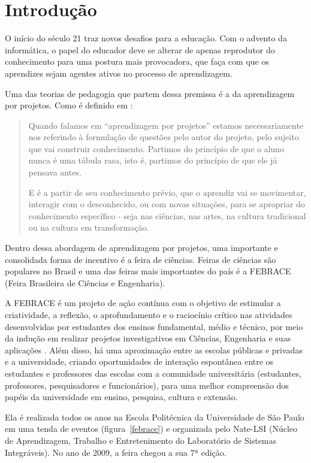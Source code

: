 
\chapter{Introdução}

O início do século 21 traz novos desafios para a educação. Com o advento da informática, o papel do educador deve se alterar de apenas reprodutor do conhecimento para uma postura mais provocadora, que faça com que os aprendizes sejam agentes ativos no processo de aprendizagem. 

Uma das teorias de pedagogia que partem dessa premissa é a da aprendizagem por projetos. Como é definido em :

\begin{quotation}
    Quando falamos em “aprendizagem por projetos” estamos necessariamente nos referindo à formulação de questões pelo autor do projeto, pelo sujeito que vai construir conhecimento. Partimos do princípio de que o aluno nunca é uma tábula rasa, isto é, partimos do princípio de que ele já pensava antes.

    E é a partir de seu conhecimento prévio, que o aprendiz vai se movimentar, interagir com o desconhecido, ou com novas situações, para se apropriar do conhecimento específico - seja nas ciências, nas artes, na cultura tradicional ou na cultura em transformação.
\end{quotation}

Dentro dessa abordagem de aprendizagem por projetos, uma importante e consolidada forma de incentivo é a feira de ciências. Feiras de ciências são populares no Brasil e uma das feiras mais importantes do país é a FEBRACE (Feira Brasileira de Ciências e Engenharia).

A FEBRACE é um projeto de ação contínua com o objetivo de estimular a criatividade, a reflexão, o aprofundamento e o raciocínio crítico nas atividades desenvolvidas por estudantes dos ensinos fundamental, médio e técnico, por meio da indução em realizar projetos investigativos em Ciências, Engenharia e suas aplicações \cite{lopes07}. Além disso, há uma aproximação entre as escolas públicas e privadas e a universidade, criando oportunidades de interação espontânea entre os estudantes e professores das escolas com a comunidade universitária (estudantes, professores, pesquisadores e funcionários), para uma melhor compreensão dos papéis da universidade em ensino, pesquisa, cultura e extensão. 

Ela é realizada todos os anos na Escola Politécnica da Universidade de São Paulo em uma tenda de eventos (figura~\ref{febrace}) e organizada pelo Nate-LSI (Núcleo de Aprendizagem, Trabalho e Entretenimento do Laboratório de Sistemas Integráveis). No ano de 2009, a feira chegou a sua 7ª edição.

